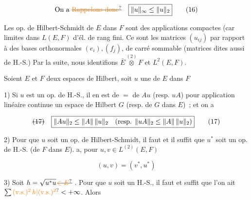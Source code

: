 \[
\text{On a }\deleted{\text{\unsure{Rappelons donc}}}\quad\boxed{\|u\|_\infty\leq\|u\|_2} \tag*{(16)}
\]

Les op. de Hilbert-Schmidt de $E$ dans $F$
sont des applications compactes (car limites dans $L(E,F)$ d'él. de rang fini. Ce sont
   les matrices $(u_{ij})$ par rapport à des bases
orthonormales $(e_i),(f_j)$,  de carré sommable
(matrices dites aussi de H.-S.)  Par la suite, nous
identifions $\bar E\overset{(2)}{\otimes} F$ et $L^2(E,F)$.


\uline{} Soient $E$ et $F$ deux espaces de Hilbert,
soit $u$ une   de $E$ dans $F$

1) Si $u$ est un op. de H.-S., il en est de $=$
de $Au$ (resp. $uA$) pour  application linéaire
continue   un espace de Hilbert $G$  (resp. de
$G$ dans $E$) \,; et on a

\[
\deleted{(17)}\quad\boxed{\|Au\|_2\leq\|A\|\,\|u\|_2\quad
\text{(resp. }\|uA\|_2\leq\|A\|\,\|u\|_2\text{)}} \tag*{(17)}
\]

2) Pour que $u$ soit un op. de Hilbert-Schmidt, il
faut et il suffit que $u^*$ soit un op. de
H.-S. (de $F$ dans $E$). 
 a, pour $u,v\in L^{(2)}(E,F)$

\[
\boxed{(u,v)=(v^*,u^*)} \tag*{(18)}
\]


3) Soit $h=\sqrt{u^*u}\,\deleted{\unsure{\in E}}$ . Pour que $u$ soit un
H.-S., il faut et suffit  
 que l'on ait $\sum\unsure{(\mathrm{v.s.})^2\,h|(\mathrm{v.s.})^2}<+\infty$. Alors

